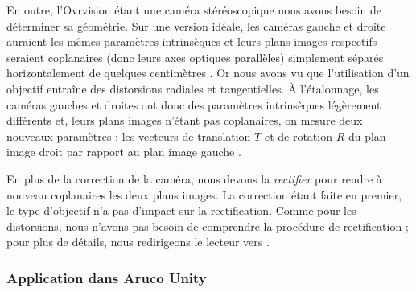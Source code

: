 En outre, l'Ovrvision étant une caméra stéréoscopique nous avons besoin de déterminer sa géométrie. Sur une version idéale, les caméras gauche et droite auraient les mêmes paramètres intrinsèques et leurs plans images respectifs seraient coplanaires (donc leurs axes optiques parallèles) simplement séparés horizontalement de quelques centimètres . Or nous avons vu que l'utilisation d'un objectif entraîne des distorsions radiales et tangentielles. À l'étalonnage, les caméras gauches et droites ont donc des paramètres intrinsèques légèrement différents et, leurs plans images n'étant pas coplanaires, on mesure deux nouveaux paramètres : les vecteurs de translation $T$ et de rotation $R$ du plan image droit par rapport au plan image gauche .

En plus de la correction de la caméra, nous devons la \emph{rectifier} pour rendre à nouveau coplanaires les deux plans images. La correction étant faite en premier, le type d'objectif n'a pas d'impact sur la rectification. Comme pour les distorsions, nous n'avons pas besoin de comprendre la procédure de rectification ; pour plus de détails, nous redirigeons le lecteur vers \cite[p. 419]{Bradski2008}.

\subsubsection{Application dans Aruco Unity}





